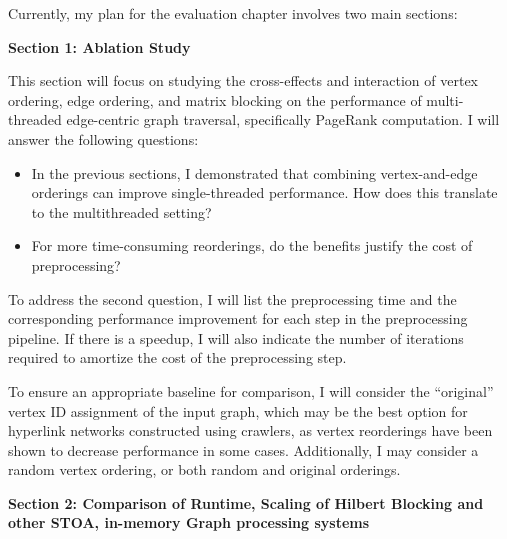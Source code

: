     \par Currently, my plan for the evaluation chapter involves two main sections:

    \textbf{Section 1: Ablation Study}
    
    This section will focus on studying the cross-effects and interaction of vertex ordering, edge ordering, and matrix blocking on the performance of multi-threaded edge-centric graph traversal, specifically PageRank computation. I will answer the following questions:
    
    \begin{itemize}
    \item In the previous sections, I demonstrated that combining vertex-and-edge orderings can improve single-threaded performance. How does this translate to the multithreaded setting?
    \item For more time-consuming reorderings, do the benefits justify the cost of preprocessing?
    \end{itemize}
    
    To address the second question, I will list the preprocessing time and the corresponding performance improvement for each step in the preprocessing pipeline. If there is a speedup, I will also indicate the number of iterations required to amortize the cost of the preprocessing step.
    
    To ensure an appropriate baseline for comparison, I will consider the ``original'' vertex ID assignment of the input graph, which may be the best option for hyperlink networks constructed using crawlers, as vertex reorderings have been shown to decrease performance in some cases. Additionally, I may consider a random vertex ordering, or both random and original orderings.
    
    \textbf{Section 2: Comparison of Runtime, Scaling of Hilbert Blocking and other STOA, in-memory Graph processing systems}

